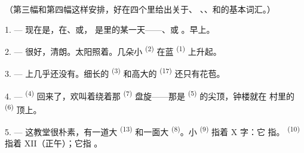 %
%

\VUsaut{3.0mm}
\VUsaut{1.6mm}
\VUsaut{3.4mm}

（第三幅和第四幅这样安排，好在四个里给出关于、
、、和的基本词汇。）
\VUsaut{4.0mm}

\VUsaut{3.0mm}

\VUsaut{2.4mm}

\VUsaut{3.0mm}

1. --- 现在是，在、或，
是里的某一天——、或
。早上。

2. --- 很好，清朗。太阳照着。几朵小
\textsuperscript{(2)} 在蓝 \textsuperscript{(1)} 上升起。

3. --- 上几乎还没有。细长的
\textsuperscript{(3)} 和高大的 \textsuperscript{(17)} 还只有花苞。

4. ---  \textsuperscript{(4)} 回来了，欢叫着绕着那
\textsuperscript{(7)} 盘旋——那是 \textsuperscript{(5)} 的尖顶，钟楼就在
村里的 \textsuperscript{(6)} 顶上。

\VUsaut{3.4mm}
\VUsaut{3.0mm}

5. --- 这教堂很朴素，有一道大 \textsuperscript{(13)} 和一面大
 \textsuperscript{(8)}。小 \textsuperscript{(9)} 指着 X 字：它
指。 \textsuperscript{(10)} 指着 XII（正午）；它指
。

